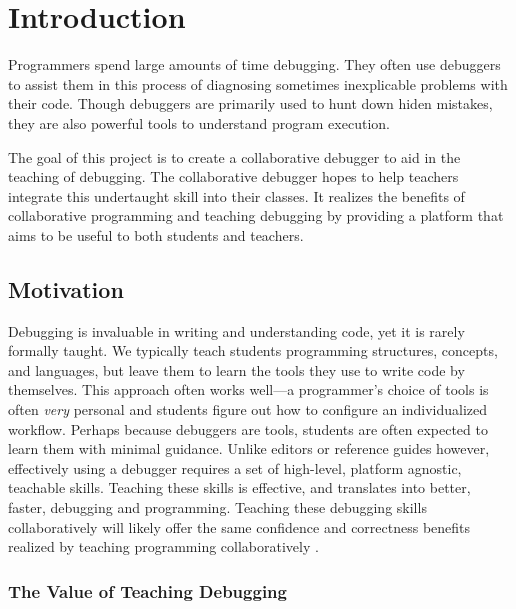 \documentclass[12pt]{article}
\begin{document}
\tableofcontents
\pagebreak

\section{Introduction}

Programmers spend large amounts of time debugging.  They often use
debuggers to assist them in this process of diagnosing sometimes
inexplicable problems with their code.  Though debuggers are primarily
used to hunt down hiden mistakes, they are also powerful tools to
understand program execution.
\par

The goal of this project is to create a collaborative debugger to aid
in the teaching of debugging.  The collaborative debugger hopes to
help teachers integrate this undertaught skill into their classes.  It
realizes the benefits of collaborative programming and teaching
debugging by providing a platform that aims to be useful to both
students and teachers.

\subsection{Motivation}

Debugging is invaluable in writing and understanding code, yet it is
rarely formally taught\cite{doi:10.1080/08993400802114581}.  We
typically teach students programming structures, concepts, and
languages, but leave them to learn the tools they use to write code by
themselves.  This approach often works well---a programmer's choice of
tools is often \textit{very} personal and students figure out how to
configure an individualized workflow.  Perhaps because debuggers are
tools, students are often expected to learn them with minimal
guidance.  Unlike editors or reference guides however, effectively
using a debugger requires a set of high-level, platform agnostic,
teachable skills.  Teaching these skills is effective, and translates
into better, faster, debugging and
programming\cite{10.1145/3286960.3286970}\cite{10.1145/3361721.3361724}.
Teaching these debugging skills collaboratively will likely offer the
same confidence and correctness benefits realized by teaching
programming collaboratively
\cite{10.1145/1026487.1008043}\cite{10.1145/1145287.1145293}.

\subsubsection{The Value of Teaching Debugging}
\end{document}
